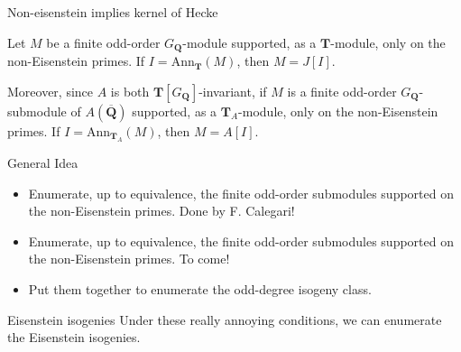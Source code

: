 \documentclass{beamer}
\newcommand{\QQ}{\mathbf{Q}}
\newcommand{\QQbar}{\overline{\mathbf{Q}}}
\newcommand{\TT}{\mathbf{T}}
\newcommand{\Ann}{\mathrm{Ann}}
\begin{document}
\begin{frame}{Non-eisenstein implies kernel of Hecke}
    \begin{theorem}[Helm]
        Let $M$ be a finite odd-order $G_\QQ$-module supported, as a $\TT$-module,
        only on the non-Eisenstein primes. If $I=\Ann_\TT(M)$, then $M=J[I]$.

        Moreover, since $A$ is both $\TT[G_\QQ]$-invariant, if $M$ is a finite
        odd-order $G_\QQ$-submodule of $A(\QQbar)$ supported, as a $\TT_A$-module,
        only on the non-Eisenstein primes. If $I=\Ann_{\TT_A}(M)$, then $M=A[I]$.
    \end{theorem}
\end{frame}

\begin{frame}{General Idea}
    \begin{itemize}
        \item 
            Enumerate, up to equivalence, the finite odd-order submodules
            supported on the non-Eisenstein primes. Done by F. Calegari!
        \item
            Enumerate, up to equivalence, the finite odd-order submodules
            supported on the non-Eisenstein primes. To come!
        \item
            Put them together to enumerate the odd-degree isogeny class.
    \end{itemize}
\end{frame}

\begin{frame}{Eisenstein isogenies}
   Under these really annoying conditions, we can enumerate the Eisenstein
   isogenies. 
\end{frame}

    
\end{document}
